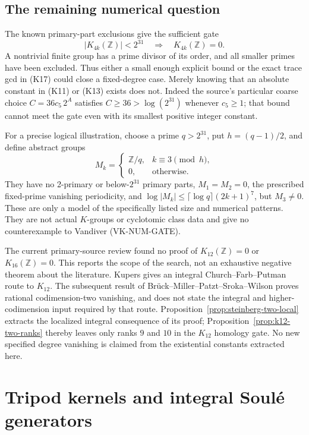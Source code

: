 \documentclass[11pt,a4paper]{article}
\theoremstyle{definition}
\begin{document}
\subsection{The remaining numerical question}

The known primary-part exclusions give the sufficient gate
\[
 |K_{4k}(\mathbb Z)|<2^{31}
 \quad\Longrightarrow\quad K_{4k}(\mathbb Z)=0.       \tag{K22}
\]
A nontrivial finite group has a prime divisor of its order,
and all smaller primes have been excluded. Thus either a
small enough explicit bound or the exact trace gcd in
(K17) could close a fixed-degree case. Merely knowing that
an absolute constant in (K11) or (K13) exists does not.
Indeed the source's particular coarse choice
\(C=36c_5\,2^A\) satisfies \(C\ge36>\log(2^{31})\)
whenever \(c_5\ge1\); that bound cannot meet the gate even
with its smallest positive integer constant.

For a precise logical illustration, choose a prime
\(q>2^{31}\), put \(h=(q-1)/2\), and define abstract groups
\[
 M_k=
 \begin{cases}
 \mathbb Z/q,& k\equiv3\pmod h,\\
 0,&\text{otherwise}.
 \end{cases}
\]
They have no 2-primary or below-\(2^{31}\) primary parts,
\(M_1=M_2=0\), the prescribed fixed-prime vanishing
periodicity, and
\(\log|M_k|\le\lceil\log q\rceil(2k+1)^7\), but
\(M_3\ne0\). These are only a model of the specifically
listed size and numerical patterns. They are not actual
\(K\)-groups or cyclotomic class data and give no
counterexample to Vandiver (VK-NUM-GATE).

The current primary-source review found no proof of
\(K_{12}(\mathbb Z)=0\) or \(K_{16}(\mathbb Z)=0\).
This reports the scope of the search, not an exhaustive
negative theorem about the literature.
Kupers \cite[Remark~2.6, p.~4]{Kupers2019} gives an
integral Church--Farb--Putman route to \(K_{12}\).
The subsequent result of Br\"uck--Miller--Patzt--Sroka--Wilson
\cite[Theorem~B]{BrueckEtAl2024} proves rational
codimension-two vanishing, and does not state the integral
and higher-codimension input required by that route.
Proposition~\ref{prop:steinberg-two-local} extracts the localized
integral consequence of its proof; Proposition~\ref{prop:k12-two-ranks}
thereby leaves only ranks $9$ and $10$ in the $K_{12}$ homology gate.
No new specified degree vanishing is claimed from the
existential constants extracted here.

\section{Tripod kernels and integral Soul\'e generators}
\label{sec:tripod-integral}
\end{document}

